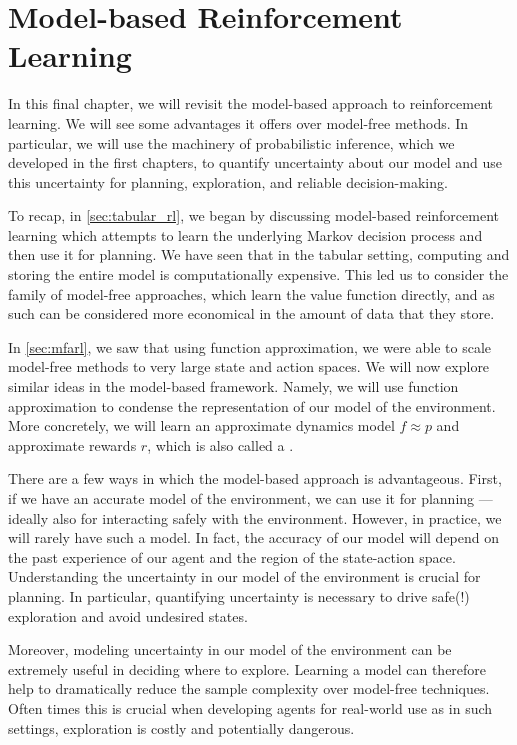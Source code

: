 \chapter{Model-based Reinforcement Learning}\label{sec:mbarl}

In this final chapter, we will revisit the model-based approach to reinforcement learning.
We will see some advantages it offers over model-free methods.
In particular, we will use the machinery of probabilistic inference, which we developed in the first chapters, to quantify uncertainty about our model and use this uncertainty for planning, exploration, and reliable decision-making.

To recap, in \cref{sec:tabular_rl}, we began by discussing model-based reinforcement learning which attempts to learn the underlying Markov decision process and then use it for planning.
We have seen that in the tabular setting, computing and storing the entire model is computationally expensive.
This led us to consider the family of model-free approaches, which learn the value function directly, and as such can be considered more economical in the amount of data that they store.

In \cref{sec:mfarl}, we saw that using function approximation, we were able to scale model-free methods to very large state and action spaces.
We will now explore similar ideas in the model-based framework.
Namely, we will use function approximation to condense the representation of our model of the environment.
More concretely, we will learn an approximate dynamics model $f \approx p$ and approximate rewards $r$, which is also called a .

There are a few ways in which the model-based approach is advantageous.
First, if we have an accurate model of the environment, we can use it for planning --- ideally also for interacting safely with the environment.
However, in practice, we will rarely have such a model.
In fact, the accuracy of our model will depend on the past experience of our agent and the region of the state-action space.
Understanding the uncertainty in our model of the environment is crucial for planning.
In particular, quantifying uncertainty is necessary to drive safe(!) exploration and avoid undesired states.

Moreover, modeling uncertainty in our model of the environment can be extremely useful in deciding where to explore.
Learning a model can therefore help to dramatically reduce the sample complexity over model-free techniques.
Often times this is crucial when developing agents for real-world use as in such settings, exploration is costly and potentially dangerous.

